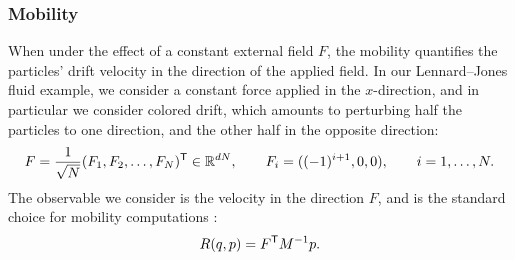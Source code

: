 \subsubsection{Mobility}
\label{subsubsec:mobility_num}
%
When under the effect of a constant external field $F$, the mobility quantifies the particles' drift velocity in the direction of the applied field. In our Lennard--Jones fluid example, we consider a constant force applied in the $x$-direction, and in particular we consider colored drift, which amounts to perturbing half the particles to one direction, and the other half in the opposite direction:
%
\begin{equation}
	F = \frac{1}{\sqrt{N}}(F_1,F_2,\dotsc,F_N)^\mathsf T \in \mathbb{R}^{dN}, \qquad F_i = ((-1)^{i+1}, 0, 0), \qquad i = 1,\dotsc,N.
\end{equation}
%
The observable we consider is the velocity in the direction $F$, and is the standard choice for mobility computations \cite[Section 5.2.2]{acta_numerica2016}:
%
\begin{equation}
	R(q,p) = F^\mathsf T M^{-1}p.
\end{equation}
%
%
